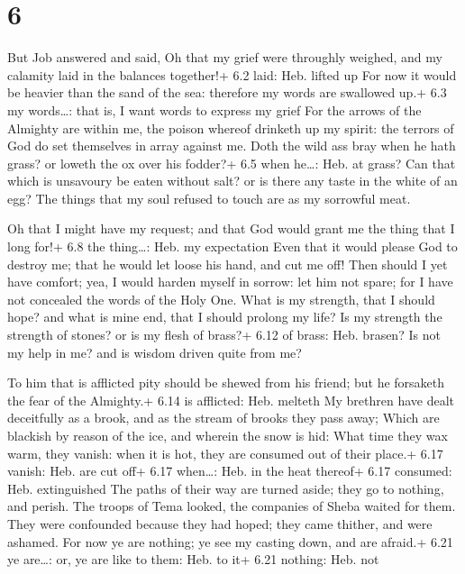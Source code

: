 \hypertarget{section-5}{%
\section{6}\label{section-5}}

 But Job answered and said,  Oh that my grief
were throughly weighed, and my calamity laid in the balances together!+
6.2 laid: Heb. lifted up  For now it would be heavier than
the sand of the sea: therefore my words are swallowed up.+ 6.3 my
words\ldots: that is, I want words to express my grief  For
the arrows of the Almighty are within me, the poison whereof drinketh up
my spirit: the terrors of God do set themselves in array against me.
 Doth the wild ass bray when he hath grass? or loweth the ox
over his fodder?+ 6.5 when he\ldots: Heb. at grass?  Can
that which is unsavoury be eaten without salt? or is there any taste in
the white of an egg?  The things that my soul refused to
touch are as my sorrowful meat.

 Oh that I might have my request; and that God would grant
me the thing that I long for!+ 6.8 the thing\ldots: Heb. my expectation
 Even that it would please God to destroy me; that he would
let loose his hand, and cut me off!  Then should I yet have
comfort; yea, I would harden myself in sorrow: let him not spare; for I
have not concealed the words of the Holy One.  What is my
strength, that I should hope? and what is mine end, that I should
prolong my life?  Is my strength the strength of stones? or
is my flesh of brass?+ 6.12 of brass: Heb. brasen?  Is not
my help in me? and is wisdom driven quite from me?

 To him that is afflicted pity should be shewed from his
friend; but he forsaketh the fear of the Almighty.+ 6.14 is afflicted:
Heb. melteth  My brethren have dealt deceitfully as a
brook, and as the stream of brooks they pass away;  Which
are blackish by reason of the ice, and wherein the snow is hid:
 What time they wax warm, they vanish: when it is hot, they
are consumed out of their place.+ 6.17 vanish: Heb. are cut off+ 6.17
when\ldots: Heb. in the heat thereof+ 6.17 consumed: Heb. extinguished
 The paths of their way are turned aside; they go to
nothing, and perish.  The troops of Tema looked, the
companies of Sheba waited for them.  They were confounded
because they had hoped; they came thither, and were ashamed.
 For now ye are nothing; ye see my casting down, and are
afraid.+ 6.21 ye are\ldots: or, ye are like to them: Heb. to it+ 6.21
nothing: Heb. not


